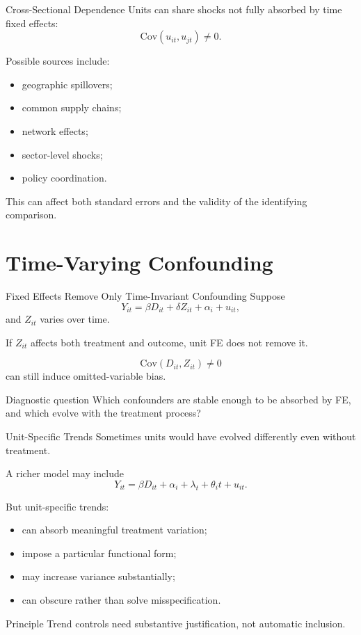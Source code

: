 \documentclass[aspectratio=169,11pt]{beamer}
\newcommand{\Cov}{\mathrm{Cov}}
\begin{document}
\begin{frame}{Cross-Sectional Dependence}
Units can share shocks not fully absorbed by time fixed effects:
\[
\Cov(u_{it},u_{jt})\neq 0.
\]

Possible sources include:
\begin{itemize}
\item geographic spillovers;
\item common supply chains;
\item network effects;
\item sector-level shocks;
\item policy coordination.
\end{itemize}

This can affect both standard errors and the validity of the identifying comparison.
\end{frame}

\section{Time-Varying Confounding}

\begin{frame}{Fixed Effects Remove Only Time-Invariant Confounding}
Suppose
\[
Y_{it}=\beta D_{it}+\delta Z_{it}+\alpha_i+u_{it},
\]
and \(Z_{it}\) varies over time.

If \(Z_{it}\) affects both treatment and outcome, unit FE does not remove it.

\[
\Cov(D_{it},Z_{it})\neq 0
\]
can still induce omitted-variable bias.

\begin{alertblock}{Diagnostic question}
Which confounders are stable enough to be absorbed by FE, and which evolve with the treatment process?
\end{alertblock}
\end{frame}

\begin{frame}{Unit-Specific Trends}
Sometimes units would have evolved differently even without treatment.

A richer model may include
\[
Y_{it}=\beta D_{it}+\alpha_i+\lambda_t+\theta_i t+u_{it}.
\]

But unit-specific trends:
\begin{itemize}
\item can absorb meaningful treatment variation;
\item impose a particular functional form;
\item may increase variance substantially;
\item can obscure rather than solve misspecification.
\end{itemize}

\begin{block}{Principle}
Trend controls need substantive justification, not automatic inclusion.
\end{block}
\end{frame}
\end{document}
